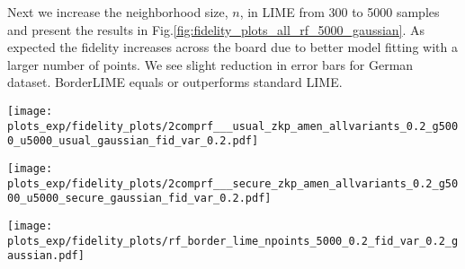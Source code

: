 Next we increase the neighborhood size, $n$, in LIME from 300 to 5000 samples and present the results in Fig.\ref{fig:fidelity_plots_all_rf_5000_gaussian}. As expected the fidelity increases across the board due to better model fitting with a larger number of points. We see slight reduction in error bars for German dataset. BorderLIME equals or outperforms standard LIME.

\begin{figure*}[h]
    \centering
    \begin{minipage}{0.35\linewidth}
        \centering
        \texttt{[image: plots\_exp/fidelity\_plots/2comprf\_\_\_usual\_zkp\_amen\_allvariants\_0.2\_g5000\_u5000\_usual\_gaussian\_fid\_var\_0.2.pdf]}
        \label{fig:simpvsorig_rf_5000_gaussian}
    \end{minipage}\hfill
    \begin{minipage}{0.35\linewidth}
        \centering
        \texttt{[image: plots\_exp/fidelity\_plots/2comprf\_\_\_secure\_zkp\_amen\_allvariants\_0.2\_g5000\_u5000\_secure\_gaussian\_fid\_var\_0.2.pdf]}
        \label{fig:border_3comp_all_rf_5000_gaussian}
    \end{minipage}\hfill
    \begin{minipage}{0.29\linewidth}
        \centering
        \texttt{[image: plots\_exp/fidelity\_plots/rf\_border\_lime\_npoints\_5000\_0.2\_fid\_var\_0.2\_gaussian.pdf]}
        \label{fig:borderlimevsnormal_rf_5000_gaussian}
    \end{minipage}\hfill
    \caption{Results for RFs for neighboring points $n=5000$ and gaussian sampling in the evaluation. Left: Fidelity of different variants of Standard LIME, Mid: Fidelity of different variants of BorderLIME , Right: Fidelity of Standard vs. BorderLIME.}
    \label{fig:fidelity_plots_all_rf_5000_gaussian}
\end{figure*}